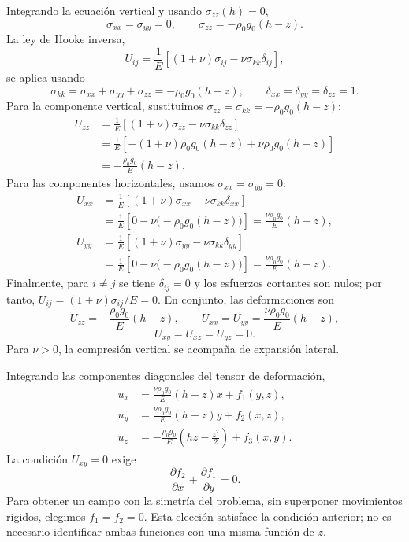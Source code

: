 \documentclass[a4paper]{article}
\begin{document}
Integrando la ecuación vertical y usando $\sigma_{zz}(h)=0$,
\[
\boxed{\sigma_{xx}=\sigma_{yy}=0},
\qquad
\boxed{\sigma_{zz}=-\rho_0g_0(h-z)}.
\]
La ley de Hooke inversa,
\[
U_{ij}=\frac{1}{E}
\left[(1+\nu)\sigma_{ij}-\nu\sigma_{kk}\delta_{ij}\right],
\]
se aplica usando
\[
\sigma_{kk}=\sigma_{xx}+\sigma_{yy}+\sigma_{zz}
=-\rho_0g_0(h-z),
\qquad
\delta_{xx}=\delta_{yy}=\delta_{zz}=1.
\]
Para la componente vertical, sustituimos $\sigma_{zz}=\sigma_{kk}=-\rho_0g_0(h-z)$:
\[
\begin{aligned}
U_{zz}
&=\frac{1}{E}\left[(1+\nu)\sigma_{zz}-\nu\sigma_{kk}\delta_{zz}\right]\\
&=\frac{1}{E}\left[-(1+\nu)\rho_0g_0(h-z)
+\nu\rho_0g_0(h-z)\right]\\
&=-\frac{\rho_0g_0}{E}(h-z).
\end{aligned}
\]
Para las componentes horizontales, usamos $\sigma_{xx}=\sigma_{yy}=0$:
\[
\begin{aligned}
U_{xx}
&=\frac{1}{E}\left[(1+\nu)\sigma_{xx}-\nu\sigma_{kk}\delta_{xx}\right]\\
&=\frac{1}{E}\left[0-\nu\bigl(-\rho_0g_0(h-z)\bigr)\right]
=\frac{\nu\rho_0g_0}{E}(h-z),\\
U_{yy}
&=\frac{1}{E}\left[(1+\nu)\sigma_{yy}-\nu\sigma_{kk}\delta_{yy}\right]\\
&=\frac{1}{E}\left[0-\nu\bigl(-\rho_0g_0(h-z)\bigr)\right]
=\frac{\nu\rho_0g_0}{E}(h-z).
\end{aligned}
\]
Finalmente, para $i\ne j$ se tiene $\delta_{ij}=0$ y los esfuerzos cortantes son nulos; por tanto, $U_{ij}=(1+\nu)\sigma_{ij}/E=0$. En conjunto, las deformaciones son
\[
U_{zz}=-\frac{\rho_0g_0}{E}(h-z),
\qquad
U_{xx}=U_{yy}=\frac{\nu\rho_0g_0}{E}(h-z),
\]
\[
U_{xy}=U_{xz}=U_{yz}=0.
\]
Para $\nu>0$, la compresión vertical se acompaña de expansión lateral.

Integrando las componentes diagonales del tensor de deformación,
\[
\begin{aligned}
u_x&=\frac{\nu\rho_0g_0}{E}(h-z)x+f_1(y,z),\\
u_y&=\frac{\nu\rho_0g_0}{E}(h-z)y+f_2(x,z),\\
u_z&=-\frac{\rho_0g_0}{E}\left(hz-\frac{z^2}{2}\right)+f_3(x,y).
\end{aligned}
\]
La condición $U_{xy}=0$ exige
\[
\frac{\partial f_2}{\partial x}+\frac{\partial f_1}{\partial y}=0.
\]
Para obtener un campo con la simetría del problema, sin superponer movimientos rígidos, elegimos $f_1=f_2=0$. Esta elección satisface la condición anterior; no es necesario identificar ambas funciones con una misma función de $z$.
\end{document}
